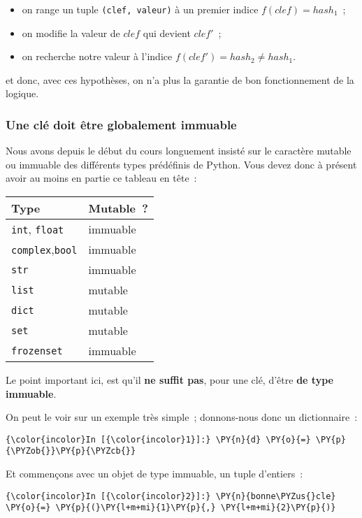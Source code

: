 \begin{itemize}
\tightlist
\item
  on range un tuple \texttt{(clef,\ valeur)} à un premier indice
  \(f(clef) = hash_1\)~;
\item
  on modifie la valeur de \(clef\) qui devient \(clef'\)~;
\item
  on recherche notre valeur à l'indice
  \(f(clef') = hash_2 \neq hash_1\).
\end{itemize}

et donc, avec ces hypothèses, on n'a plus la garantie de bon
fonctionnement de la logique.

    \hypertarget{une-cluxe9-doit-uxeatre-globalement-immuable}{%
\subsubsection{Une clé doit être globalement
immuable}\label{une-cluxe9-doit-uxeatre-globalement-immuable}}

    Nous avons depuis le début du cours longuement insisté sur le caractère
mutable ou immuable des différents types prédéfinis de Python. Vous
devez donc à présent avoir au moins en partie ce tableau en tête~:

\begin{longtable}[]{@{}ll@{}}
\toprule
Type & Mutable~?\tabularnewline
\midrule
\endhead
\texttt{int}, \texttt{float} & immuable\tabularnewline
\texttt{complex},\texttt{bool} & immuable\tabularnewline
\texttt{str} & immuable\tabularnewline
\texttt{list} & mutable\tabularnewline
\texttt{dict} & mutable\tabularnewline
\texttt{set} & mutable\tabularnewline
\texttt{frozenset} & immuable\tabularnewline
\bottomrule
\end{longtable}

    Le point important ici, est qu'il \textbf{ne suffit pas}, pour une clé,
d'être \textbf{de type immuable}.

On peut le voir sur un exemple très simple~; donnons-nous donc un
dictionnaire~:

    \begin{Verbatim}[commandchars=\\\{\}]
{\color{incolor}In [{\color{incolor}1}]:} \PY{n}{d} \PY{o}{=} \PY{p}{\PYZob{}}\PY{p}{\PYZcb{}}
\end{Verbatim}


    Et commençons avec un objet de type immuable, un tuple d'entiers~:

    \begin{Verbatim}[commandchars=\\\{\}]
{\color{incolor}In [{\color{incolor}2}]:} \PY{n}{bonne\PYZus{}cle} \PY{o}{=} \PY{p}{(}\PY{l+m+mi}{1}\PY{p}{,} \PY{l+m+mi}{2}\PY{p}{)}
\end{Verbatim}


